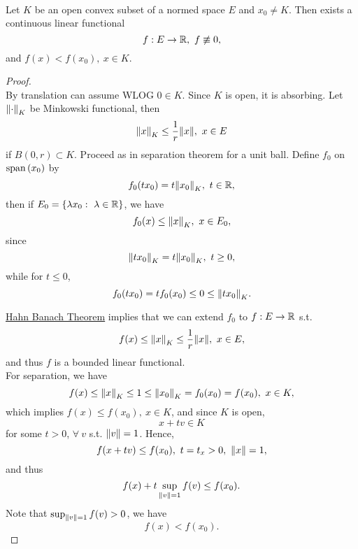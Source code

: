 \begin{theorem}\ \\
Let $K$ be an open convex subset of a normed space $E$ and $x_0 \neq K$. Then exists a continuous linear functional
\begin{equation*}
    f: E \to \mathbb{R},\ f \not\equiv 0,
\end{equation*}
and $f(x) < f(x_0),\ x \in K$.
\end{theorem}
\begin{proof}\ \\
By translation can assume WLOG $0 \in K$. Since $K$ is open, it is absorbing. Let $\norm{\cdot}_K$ be Minkowski functional, then
\begin{equation*}
    \norm{x}_K \leq \frac{1}{r} \norm{x},\ x \in E
\end{equation*}
if $B(0,r) \subset K$. Proceed as in separation theorem for a unit ball. Define $f_0$ on $\operatorname{span}\left(x_0\right)$ by
\begin{equation*}
    f_0(tx_0) = t\norm{x_0}_K,\ t \in \mathbb{R},
\end{equation*}
then if $E_0 = \{\lambda x_0:\ \lambda \in \mathbb{R}\}$, we have
\begin{equation*}
    f_0(x) \leq \norm{x}_K,\ x \in E_0,
\end{equation*}
since \begin{equation*}
    \norm{tx_0}_K = t \norm{x_0}_K,\ t \geq 0,
\end{equation*}
while for $t \leq 0$,
\begin{equation*}
    f_0(tx_0) = t f_0(x_0) \leq 0 \leq  \norm{t x_0}_K.
\end{equation*}

\np \hyperref[HB thm]{Hahn Banach Theorem} implies that we can extend $f_0$ to $f: E \to \mathbb{R}$ s.t.
\begin{equation*}
    f(x) \leq \norm{x}_K \leq \frac{1}{r} \norm{x},\ x \in E,
\end{equation*}
and thus $f$ is a bounded linear functional.\\
For separation, we have
\begin{equation*}
    f(x) \leq \norm{x}_K \leq 1 \leq \norm{x_0}_K = f_0(x_0) = f(x_0),\ x \in K,
\end{equation*}
which implies $f(x) \leq f(x_0),\ x \in K$, and since $K$ is open,
\begin{equation*}
    x + tv \in K
\end{equation*}
for some $t > 0$, $\forall\ v$ s.t. $\norm{v} = 1$. Hence,
\begin{equation*}
    f(x + tv) \leq f(x_0),\ t = t_x > 0,\ \norm{x} = 1,
\end{equation*}
and thus 
\begin{equation*}
    f(x) + t \sup_{\norm{v} = 1} f(v) \leq f(x_0).
\end{equation*}
Note that $\sup_{\norm{v} = 1} f(v) > 0$, we have
\begin{equation*}
    f(x) < f(x_0).
\end{equation*}
\end{proof}


